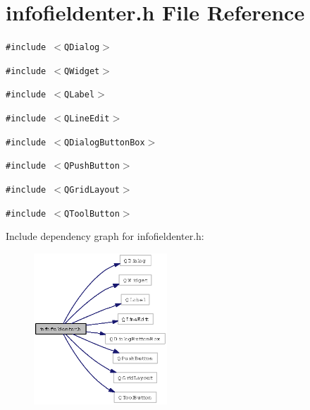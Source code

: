 \section{infofieldenter.h File Reference}
\label{infofieldenter_8h}
{\tt \#include $<$QDialog$>$}\par
{\tt \#include $<$QWidget$>$}\par
{\tt \#include $<$QLabel$>$}\par
{\tt \#include $<$QLine\-Edit$>$}\par
{\tt \#include $<$QDialog\-Button\-Box$>$}\par
{\tt \#include $<$QPush\-Button$>$}\par
{\tt \#include $<$QGrid\-Layout$>$}\par
{\tt \#include $<$QTool\-Button$>$}\par


Include dependency graph for infofieldenter.h:\begin{figure}[H]
\begin{center}
\leavevmode
\includegraphics[width=142pt]{infofieldenter_8h__incl}
\end{center}
\end{figure}


